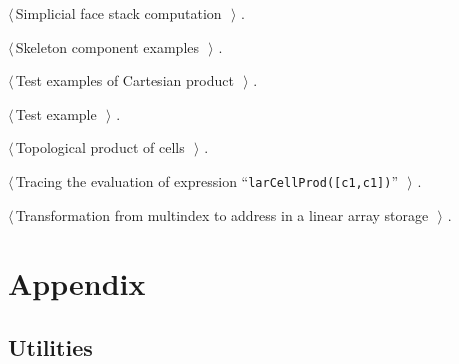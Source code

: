 \documentclass[11pt,oneside]{article}	%
\begin{document}
{\begin{list}{}{\setlength{\itemsep}{-\parsep}\setlength{\itemindent}{-\leftmargin}}
\item $\langle\,$Simplicial face stack computation\nobreak\ {\footnotesize {}}$\,\rangle$ {\footnotesize {\NWtxtRefIn} .}
\item $\langle\,$Skeleton component examples\nobreak\ {\footnotesize {}}$\,\rangle$ {\footnotesize {\NWtxtNoRef}.}
\item $\langle\,$Test examples of Cartesian product\nobreak\ {\footnotesize {}}$\,\rangle$ {\footnotesize {\NWtxtRefIn} .}
\item $\langle\,$Test example\nobreak\ {\footnotesize {}}$\,\rangle$ {\footnotesize {\NWtxtNoRef}.}
\item $\langle\,$Topological product of cells\nobreak\ {\footnotesize {}}$\,\rangle$ {\footnotesize {\NWtxtRefIn} .}
\item $\langle\,$Tracing the evaluation of expression ``\texttt{larCellProd([c1,c1])}''\nobreak\ {\footnotesize {}}$\,\rangle$ {\footnotesize {\NWtxtNoRef}.}
\item $\langle\,$Transformation from multindex to address in a linear array storage\nobreak\ {\footnotesize {}}$\,\rangle$ {\footnotesize {\NWtxtRefIn} .}
\end{list}}

\appendix
\section{Appendix}
\label{sec:utilities}

\subsection{Utilities}
\end{document}
